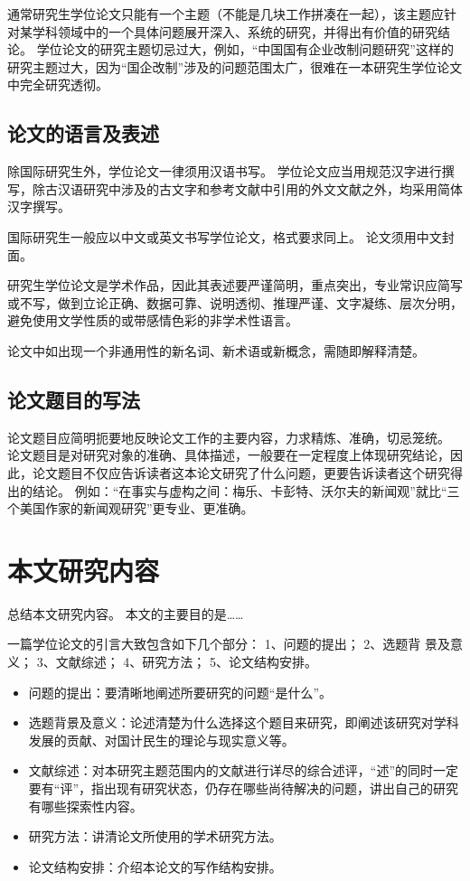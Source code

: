 通常研究生学位论文只能有一个主题（不能是几块工作拼凑在一起），该主题应针对某学科领域中的一个具体问题展开深入、系统的研究，并得出有价值的研究结论。
学位论文的研究主题切忌过大，例如，“中国国有企业改制问题研究”这样的研究主题过大，因为“国企改制”涉及的问题范围太广，很难在一本研究生学位论文中完全研究透彻。

\subsection{论文的语言及表述}

除国际研究生外，学位论文一律须用汉语书写。
学位论文应当用规范汉字进行撰写，除古汉语研究中涉及的古文字和参考文献中引用的外文文献之外，均采用简体汉字撰写。

国际研究生一般应以中文或英文书写学位论文，格式要求同上。
论文须用中文封面。

研究生学位论文是学术作品，因此其表述要严谨简明，重点突出，专业常识应简写或不写，做到立论正确、数据可靠、说明透彻、推理严谨、文字凝练、层次分明，避免使用文学性质的或带感情色彩的非学术性语言。

论文中如出现一个非通用性的新名词、新术语或新概念，需随即解释清楚。

\subsection{论文题目的写法}

论文题目应简明扼要地反映论文工作的主要内容，力求精炼、准确，切忌笼统。
论文题目是对研究对象的准确、具体描述，一般要在一定程度上体现研究结论，因此，论文题目不仅应告诉读者这本论文研究了什么问题，更要告诉读者这个研究得出的结论。
例如：“在事实与虚构之间：梅乐、卡彭特、沃尔夫的新闻观”就比“三个美国作家的新闻观研究”更专业、更准确。

\section{本文研究内容}

总结本文研究内容。
本文的主要目的是……

一篇学位论文的引言大致包含如下几个部分：
1、问题的提出；
2、选题背 景及意义；
3、文献综述；
4、研究方法；
5、论文结构安排。
\begin{itemize}
  \item 问题的提出：要清晰地阐述所要研究的问题“是什么”。
  \item 选题背景及意义：论述清楚为什么选择这个题目来研究，即阐述该研究对学科发展的贡献、对国计民生的理论与现实意义等。
  \item 文献综述：对本研究主题范围内的文献进行详尽的综合述评，“述”的同时一定要有“评”，指出现有研究状态，仍存在哪些尚待解决的问题，讲出自己的研究有哪些探索性内容。
  \item 研究方法：讲清论文所使用的学术研究方法。
  \item 论文结构安排：介绍本论文的写作结构安排。
\end{itemize}

